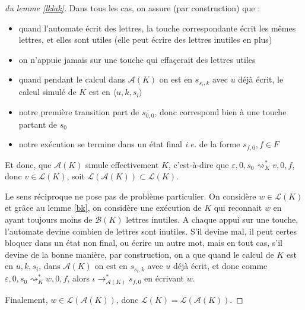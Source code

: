 \documentclass[12pt, a4paper]{article}
\renewcommand{\L}{\mathcal{L}}
\newcommand{\A}{\mathcal{A}}
\begin{document}
\begin{proof}[du lemme \ref{lklak}]
       Dans tous les cas, on assure (par construction) que :
       \begin{itemize}
        \item quand l'automate écrit des lettres, la touche correspondante écrit les mêmes lettres, et elles sont utiles (elle peut écrire des lettres inutiles en plus)
        \item on n'appuie jamais sur une touche qui effaçerait des lettres utiles 
        \item quand pendant le calcul dans $\A(K)$ on est en $s_{s_i,k}$ avec $u$ déjà écrit, le calcul simulé de $K$ est en $\langle u,k,s_i\rangle$
        \item notre première transition part de $\overline{s_{0,0}}$, donc correspond bien à une touche partant de $s_0$ 
        \item notre exécution se termine dans un état final \textit{i.e.} de la forme $s_{f,0}, f \in F$
       \end{itemize} 
       Et donc, que $\A(K)$ simule effectivement $K$, c'est-à-dire que $\varepsilon,0,s_0 \rightsquigarrow^*_K v,0,f$, donc $v \in \L(K)$, soit $\L(\A(K)) \subset \L(K)$.

       Le sens réciproque ne pose pas de problème particulier. On considère $w \in \L(K)$ et grâce au lemme \ref{bk}, on considère une exécution de $K$ qui reconnait $w$ en ayant toujours moins de $\mathcal{B}(K)$ lettres inutiles.
       A chaque appui sur une touche, l'automate devine combien de lettres sont inutiles. 
       S'il devine mal, il peut certes bloquer dans un état non final, ou écrire un autre mot, mais en tout cas, s'il devine de la bonne manière, par construction, on a que quand le calcul de $K$ est en $u,k,s_i$, dans $\A(K)$ on est en $s_{s_i,k}$ avec $u$ déjà écrit, et donc comme $\varepsilon,0,s_0 \rightsquigarrow^*_K w,0,f$, alors $\iota \rightarrow^*_{\A(K)} s_{f,0}$ en écrivant $w$. 
       
       Finalement, $w \in \L(\A(K))$, donc $\L(K) = \L(\A(K))$.
    \end{proof}

    \clearpage
    \printbibliography
\end{document}
